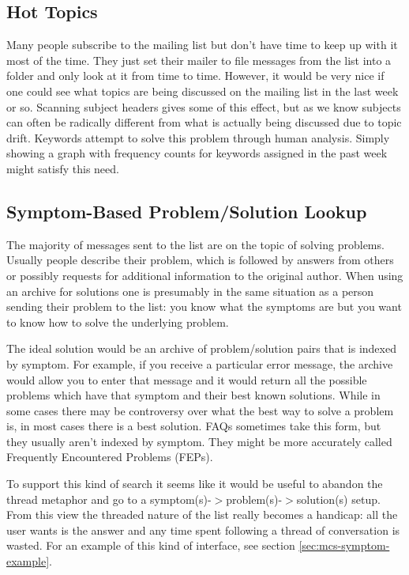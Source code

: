 \subsection{Hot Topics}
Many people subscribe to the mailing list but don't have time to keep up with
it most of the time. They just set their mailer to file messages from the list
into a folder and only look at it from time to time. However, it would be very
nice if one could see what topics are being discussed on the mailing list in
the last week or so. Scanning subject headers gives some of this effect, but as
we know subjects can often be radically different from what is actually being
discussed due to topic drift. Keywords attempt to solve this problem through
human analysis. Simply showing a graph with frequency counts for keywords
assigned in the past week might satisfy this need.

\subsection{Symptom-Based Problem/Solution Lookup}
\label{sec:problem-solution-lookup}
The majority of messages sent to the list are on the topic of solving problems.
Usually people describe their problem, which is followed by answers from others
or possibly requests for additional information to the original author. When
using an archive for solutions one is presumably in the same situation as a
person sending their problem to the list: you know what the symptoms are but
you want to know how to solve the underlying problem.

The ideal solution would be an archive of problem/solution pairs that is
indexed by symptom. For example, if you receive a particular error message, the
archive would allow you to enter that message and it would return all the
possible problems which have that symptom and their best known solutions. While
in some cases there may be controversy over what the best way to solve a
problem is, in most cases there is a best solution. FAQs sometimes take this
form, but they usually aren't indexed by symptom. They might be more accurately
called Frequently Encountered Problems (FEPs).

To support this kind of search it seems like it would be useful to abandon the
thread metaphor and go to a symptom(s)-$>$problem(s)-$>$solution(s) setup. From
this view the threaded nature of the list really becomes a handicap: all the
user wants is the answer and any time spent following a thread of conversation
is wasted. For an example of this kind of interface, see section
\ref{sec:mcs-symptom-example}.

